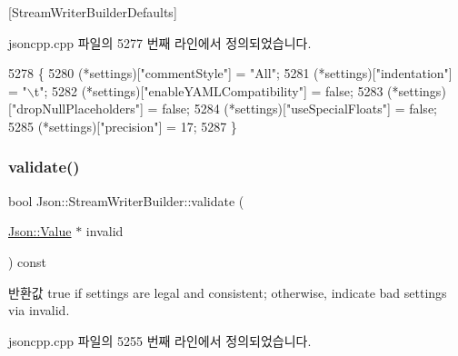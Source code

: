 \mbox{[}Stream\+Writer\+Builder\+Defaults\mbox{]} 

jsoncpp.\+cpp 파일의 5277 번째 라인에서 정의되었습니다.


\begin{DoxyCode}
5278 \{
5280   (*settings)[\textcolor{stringliteral}{"commentStyle"}] = \textcolor{stringliteral}{"All"};
5281   (*settings)[\textcolor{stringliteral}{"indentation"}] = \textcolor{stringliteral}{"\(\backslash\)t"};
5282   (*settings)[\textcolor{stringliteral}{"enableYAMLCompatibility"}] = \textcolor{keyword}{false};
5283   (*settings)[\textcolor{stringliteral}{"dropNullPlaceholders"}] = \textcolor{keyword}{false};
5284   (*settings)[\textcolor{stringliteral}{"useSpecialFloats"}] = \textcolor{keyword}{false};
5285   (*settings)[\textcolor{stringliteral}{"precision"}] = 17;
5287 \}
\end{DoxyCode}
\mbox{\label{class_json_1_1_stream_writer_builder_a12353b97766841db7d049da84658da09}} 
\subsubsection{\texorpdfstring{validate()}{validate()}}
{\footnotesize\ttfamily bool Json\+::\+Stream\+Writer\+Builder\+::validate (\begin{DoxyParamCaption}\item[{\hyperlink{class_json_1_1_value}{Json\+::\+Value} $\ast$}]{invalid }\end{DoxyParamCaption}) const}

\begin{DoxyReturn}{반환값}
true if \textquotesingle{}settings\textquotesingle{} are legal and consistent; otherwise, indicate bad settings via \textquotesingle{}invalid\textquotesingle{}. 
\end{DoxyReturn}


jsoncpp.\+cpp 파일의 5255 번째 라인에서 정의되었습니다.


